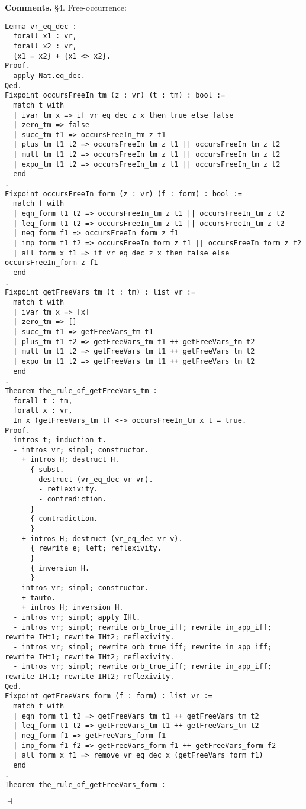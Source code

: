 \documentclass[12pt]{paper}
\newenvironment{context}[1][]{\noindent \textbf{{#1}.}}{\hfill $ \dashv $}
\begin{document}
\begin{context}[Comments]
    \S4. Free-occurrence:
\begin{lstlisting}[frame=single]
Lemma vr_eq_dec :
  forall x1 : vr,
  forall x2 : vr,
  {x1 = x2} + {x1 <> x2}.
Proof.
  apply Nat.eq_dec.
Qed.
Fixpoint occursFreeIn_tm (z : vr) (t : tm) : bool :=
  match t with
  | ivar_tm x => if vr_eq_dec z x then true else false
  | zero_tm => false
  | succ_tm t1 => occursFreeIn_tm z t1
  | plus_tm t1 t2 => occursFreeIn_tm z t1 || occursFreeIn_tm z t2
  | mult_tm t1 t2 => occursFreeIn_tm z t1 || occursFreeIn_tm z t2
  | expo_tm t1 t2 => occursFreeIn_tm z t1 || occursFreeIn_tm z t2
  end
.
Fixpoint occursFreeIn_form (z : vr) (f : form) : bool :=
  match f with
  | eqn_form t1 t2 => occursFreeIn_tm z t1 || occursFreeIn_tm z t2
  | leq_form t1 t2 => occursFreeIn_tm z t1 || occursFreeIn_tm z t2
  | neg_form f1 => occursFreeIn_form z f1
  | imp_form f1 f2 => occursFreeIn_form z f1 || occursFreeIn_form z f2
  | all_form x f1 => if vr_eq_dec z x then false else occursFreeIn_form z f1
  end
.
Fixpoint getFreeVars_tm (t : tm) : list vr :=
  match t with
  | ivar_tm x => [x]
  | zero_tm => []
  | succ_tm t1 => getFreeVars_tm t1
  | plus_tm t1 t2 => getFreeVars_tm t1 ++ getFreeVars_tm t2
  | mult_tm t1 t2 => getFreeVars_tm t1 ++ getFreeVars_tm t2
  | expo_tm t1 t2 => getFreeVars_tm t1 ++ getFreeVars_tm t2
  end
.
Theorem the_rule_of_getFreeVars_tm :
  forall t : tm,
  forall x : vr,
  In x (getFreeVars_tm t) <-> occursFreeIn_tm x t = true.
Proof.
  intros t; induction t.
  - intros vr; simpl; constructor.
    + intros H; destruct H.
      { subst.
        destruct (vr_eq_dec vr vr).
        - reflexivity.
        - contradiction.
      }
      { contradiction.
      }
    + intros H; destruct (vr_eq_dec vr v).
      { rewrite e; left; reflexivity.
      }
      { inversion H.
      }
  - intros vr; simpl; constructor.
    + tauto.
    + intros H; inversion H.
  - intros vr; simpl; apply IHt.
  - intros vr; simpl; rewrite orb_true_iff; rewrite in_app_iff; rewrite IHt1; rewrite IHt2; reflexivity.
  - intros vr; simpl; rewrite orb_true_iff; rewrite in_app_iff; rewrite IHt1; rewrite IHt2; reflexivity.
  - intros vr; simpl; rewrite orb_true_iff; rewrite in_app_iff; rewrite IHt1; rewrite IHt2; reflexivity.
Qed.
Fixpoint getFreeVars_form (f : form) : list vr :=
  match f with
  | eqn_form t1 t2 => getFreeVars_tm t1 ++ getFreeVars_tm t2
  | leq_form t1 t2 => getFreeVars_tm t1 ++ getFreeVars_tm t2
  | neg_form f1 => getFreeVars_form f1
  | imp_form f1 f2 => getFreeVars_form f1 ++ getFreeVars_form f2
  | all_form x f1 => remove vr_eq_dec x (getFreeVars_form f1)
  end
.
Theorem the_rule_of_getFreeVars_form :

\end{lstlisting}
\end{context}
\end{document}
